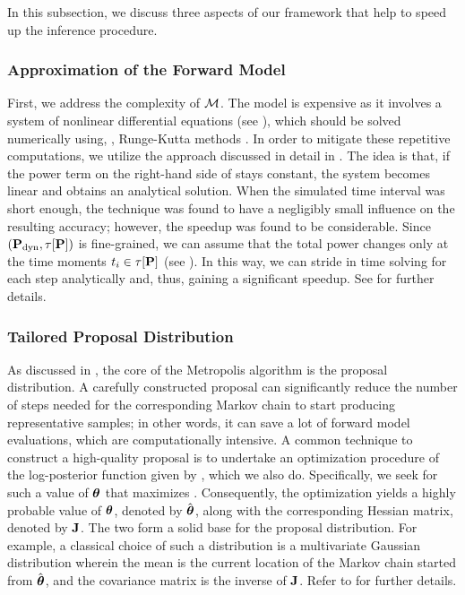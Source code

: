 In this subsection, we discuss three aspects of our framework that help to speed up the inference procedure.

\subsubsection{Approximation of the Forward Model} 
First, we address the complexity of $\model$. The model is expensive as it involves a system of nonlinear differential equations (see ), which should be solved numerically using, \eg, Runge-Kutta methods \cite{press2007}. In order to mitigate these repetitive computations, we utilize the approach discussed in detail in \cite{ukhov2012}.
The idea is that, if the power term on the right-hand side of  stays constant, the system becomes linear and obtains an analytical solution. When the simulated time interval was short enough, the technique was found to have a negligibly small influence on the resulting accuracy; however, the speedup was found to be considerable.
Since $(\mathbf{P}_{\text{dyn}}, \tau[\mathbf{P}])$ is fine-grained, we can assume that the total power changes only at the time moments $t_i \in \tau[\mathbf{P}]$ (see ). In this way, we can stride in time solving  for each step analytically and, thus, gaining a significant speedup. See \cite{ukhov2012} for further details.

\subsubsection{Tailored Proposal Distribution} 
As discussed in , the core of the Metropolis algorithm is the proposal distribution. A carefully constructed proposal can significantly reduce the number of steps needed for the corresponding Markov chain to start producing representative samples; in other words, it can save a lot of forward model evaluations, which are computationally intensive.
A common technique to construct a high-quality proposal is to undertake an optimization procedure of the log-posterior function given by , which we also do. Specifically, we seek for such a value of ${\boldsymbol\theta}$ that maximizes .
Consequently, the optimization yields a highly probable value of ${\boldsymbol\theta}$, denoted by $\hat{{\boldsymbol\theta}}$, along with the corresponding Hessian matrix, denoted by $\mathbf{J}$. The two form a solid base for the proposal distribution.
For example, a classical choice of such a distribution is a multivariate Gaussian distribution wherein the mean is the current location of the Markov chain started from $\hat{{\boldsymbol\theta}}$, and the covariance matrix is the inverse of $\mathbf{J}$. Refer to \cite{gelman2004} for further details.

